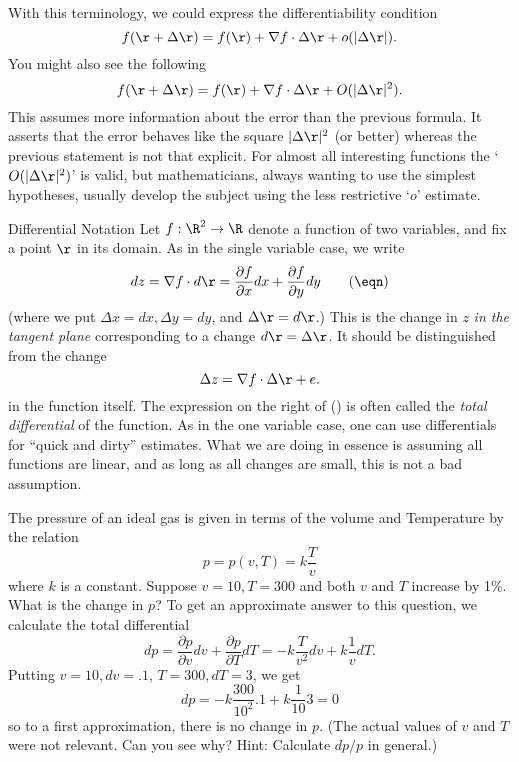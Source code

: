  With this terminology, we could express the differentiability
condition
$$
    f(\r + \Delta \r) = f(\r) + \nabla f\cdot \Delta \r + o(|\Delta \r|).
$$
You might also see the following
$$
    f(\r + \Delta \r) = f(\r) + \nabla f\cdot \Delta\r + O(|\Delta \r|^2).
$$
This assumes more information about the error than the previous
formula.  It asserts that the error behaves like 
the square $|\Delta \r|^2$  (or better) whereas the previous
statement is not that explicit.  For almost all interesting functions
the `$O(|\Delta \r|^2)$' is valid, but mathematicians, always
wanting to use the simplest hypotheses, usually develop
the subject using the less restrictive `$o$' estimate. 


\subhead Differential Notation \endsubhead
Let $f:\R^2 \to \R$ denote a function of two variables, and fix
a point $\r$ in its domain.
As in the single variable case, we
write
\nexteqn
\xdef\TotDiff{\eqn}
$$
    dz = \nabla f\cdot d\r = 
\frac{\partial f}{\partial x}dx + \frac{\partial f}{\partial y}
dy\tag\eqn
$$
(where we put $\Delta x = dx, \Delta y = dy$, and $\Delta \r = d\r$.)
This is the change in  
 $z$ {\it in the tangent plane\/}
%
 corresponding to a
change $d\r = \Delta \r$.  
It should  be distinguished from the change 
$$
    \Delta z = \nabla f\cdot \Delta \r  + e.
$$ 
in the function itself. 
The expression on the right of (\TotDiff)
 is often called the {\it total
differential} of the function.   As in the one variable case, one
%
%
can use differentials for ``quick and dirty'' estimates.  What we
are doing in essence is assuming all functions are linear, and as
long as all changes are small, this is not a bad assumption.
 
\nexteqn
{}
The pressure of an ideal gas is given in terms of the volume and
Temperature by the relation
$$
   p = p(v,T) = k\frac Tv
$$
where $k$ is a constant.  Suppose $v = 10, T = 300$ and both
 $v$ and $T$ increase by 
1\%.  What is the change in $p$?   To get an approximate
answer to this question, we calculate the total differential
$$
  dp = \frac{\partial p}{\partial v}dv +
       \frac{\partial p}{\partial T}dT
     = -k\frac T{v^2}dv + k\frac 1v dT.
$$
Putting $v = 10, dv = .1,\, T = 300, dT = 3$, we
get
$$ 
 dp = -k\frac {300}{10^2}.1 + k\frac 1{10} 3 = 0
$$
so to a first approximation, there is no change in $p$.
(The actual values of $v$ and $T$ were not relevant.
Can you see why?  Hint: Calculate $dp/p$ in general.)
\endexample

